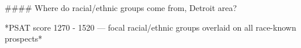 #### Where do racial/ethnic groups come from, Detroit area?

*PSAT score 1270 - 1520 — focal racial/ethnic groups overlaid on all race-known prospects*
